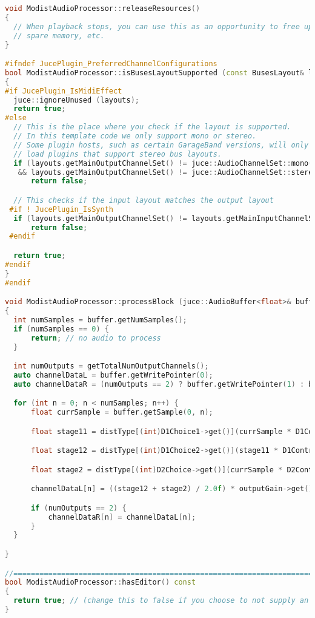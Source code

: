 \documentclass{article}
\begin{document}
\begin{appendix}
\begin{lstlisting}[language=C++]
void ModistAudioProcessor::releaseResources()
{
  // When playback stops, you can use this as an opportunity to free up any
  // spare memory, etc.
}

#ifndef JucePlugin_PreferredChannelConfigurations
bool ModistAudioProcessor::isBusesLayoutSupported (const BusesLayout& layouts) const
{
#if JucePlugin_IsMidiEffect
  juce::ignoreUnused (layouts);
  return true;
#else
  // This is the place where you check if the layout is supported.
  // In this template code we only support mono or stereo.
  // Some plugin hosts, such as certain GarageBand versions, will only
  // load plugins that support stereo bus layouts.
  if (layouts.getMainOutputChannelSet() != juce::AudioChannelSet::mono()
   && layouts.getMainOutputChannelSet() != juce::AudioChannelSet::stereo())
      return false;

  // This checks if the input layout matches the output layout
 #if ! JucePlugin_IsSynth
  if (layouts.getMainOutputChannelSet() != layouts.getMainInputChannelSet())
      return false;
 #endif

  return true;
#endif
}
#endif

void ModistAudioProcessor::processBlock (juce::AudioBuffer<float>& buffer, juce::MidiBuffer& midiMessages)
{
  int numSamples = buffer.getNumSamples();
  if (numSamples == 0) {
      return; // no audio to process
  }

  int numOutputs = getTotalNumOutputChannels();
  auto channelDataL = buffer.getWritePointer(0);
  auto channelDataR = (numOutputs == 2) ? buffer.getWritePointer(1) : buffer.getWritePointer(0);

  for (int n = 0; n < numSamples; n++) {
      float currSample = buffer.getSample(0, n);

      float stage11 = distType[(int)D1Choice1->get()](currSample * D1Control1->get());

      float stage12 = distType[(int)D1Choice2->get()](stage11 * D1Control2->get());

      float stage2 = distType[(int)D2Choice->get()](currSample * D2Control->get());

      channelDataL[n] = ((stage12 + stage2) / 2.0f) * outputGain->get();

      if (numOutputs == 2) {
          channelDataR[n] = channelDataL[n];
      }
  }

}

//==============================================================================
bool ModistAudioProcessor::hasEditor() const
{
  return true; // (change this to false if you choose to not supply an editor)
}


\end{lstlisting}
\end{appendix}
\end{document}
